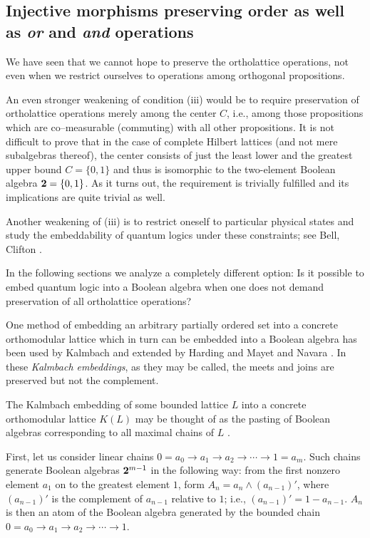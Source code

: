 \subsection{Injective morphisms preserving order as well as {\it
or} and
{\it and} operations}
\label{section:2.3a}

We have seen that we cannot hope to preserve the ortholattice operations,
not even when we restrict ourselves to  operations
among orthogonal propositions.

An even stronger weakening of condition (iii) would be to require
preservation of
ortholattice operations merely among the center $C$,  i.e., among those
propositions which are
co--measurable (commuting) with all other propositions. It is not difficult
to prove that in the case
of complete Hilbert lattices (and not mere subalgebras thereof), the
center consists of just the least lower and the greatest upper bound
$C=\{0,1\}$ and thus is
isomorphic to the two-element Boolean algebra ${\bf 2}=\{0,1\}$.
As it turns out,  the requirement is trivially fulfilled and its
implications are quite trivial as well.

Another weakening of (iii) is to restrict oneself to particular physical
states and study the embeddability of quantum logics under these
constraints; see Bell, Clifton \cite{bell-clifton}.


In the following sections we analyze a completely different option: Is
it possible
to embed quantum logic into a Boolean algebra when one does not demand
preservation of all ortholattice operations?


One method of embedding an arbitrary partially ordered set
into
a concrete orthomodular lattice which in turn can be embedded into a
Boolean algebra has been used by Kalmbach \cite{kalmbach-77} and
extended by Harding \cite{harding-91} and Mayet and Navara
\cite{navara-95}. In
these {\it Kalmbach embeddings}, as they may be called,
the meets and joins are preserved but not the complement.


The Kalmbach embedding of some bounded lattice $L$ into a concrete
orthomodular lattice
$K(L)$ may be thought of as the pasting of Boolean algebras
corresponding to all maximal chains of $L$ \cite{harding-priv}.

First, let us consider  linear chains
$0=a_0\rightarrow
a_1\rightarrow a_2\rightarrow \cdots \rightarrow 1=a_m$.
Such chains
generate Boolean algebras ${\bf 2}^{m-1}$ in the following way: from the first
nonzero element $a_1$ on to the greatest element $1$, form
$A_n=a_n\wedge (a_{n-1})'$, where $(a_{n-1})'$ is the complement of $a_{n-1}$
relative to $1$; i.e., $(a_{n-1})'=1-a_{n-1}$.  $A_n$ is then an atom of the
Boolean algebra generated by the bounded chain
$0=a_0\rightarrow
a_1\rightarrow a_2\rightarrow \cdots \rightarrow 1$.

